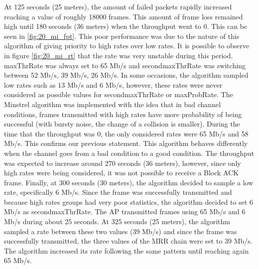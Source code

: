 \documentclass[12]{article}
\begin{document}
At 125 seconds (25 meters), the amount of failed packets rapidly increased reaching a value of roughly 18000 frames. This amount of frame loss remained high until 180 seconds (36 meters) when the throughput went to 0. This can be seen in \ref{fig:20_mi_fpt}. This poor performance was due to the nature of this algorithm of giving priority to high rates over low rates. It is possible to observe in figure \ref{fig:20_mi_rt} that the rate was very unstable during this period. maxThrRate was always set to 65 Mb/s and secondmaxThrRate was switching between 52 Mb/s, 39 Mb/s, 26 Mb/s. In some occasions, the algorithm sampled low rates such as 13 Mb/s and 6 Mb/s, however, these rates were never considered as possible values for secondmaxThrRate or maxProbRate. The Minstrel algorithm was implemented with the idea that in bad channel conditions, frames transmitted with high rates have more probability of being successful (with bursty noise, the change of a collision is smaller). During the time that the throughput was 0, the only considered rates were 65 Mb/s and 58 Mb/s. This confirms our previous statement. This algorithm behaves differently when the channel goes from a bad condition to a good condition. The throughput was expected to increase around 270 seconds (36 meters), however, since only high rates were being considered, it was not possible to receive a Block ACK frame. Finally, at 300 seconds (30 meters), the algorithm decided to sample a low rate, specifically 6 Mb/s. Since the frame was successfully transmitted and because high rates groups had very poor statistics, the algorithm decided to set 6 Mb/s as secondmaxThrRate. The AP transmitted frames using 65 Mb/s and 6 Mb/s during about 25 seconds. At 325 seconds (25 meters), the algorithm sampled a rate between these two values (39 Mb/s) and since the frame was successfully transmitted, the three values of the MRR chain were set to 39 Mb/s. The algorithm increased its rate following the same pattern until reaching again 65 Mb/s.\\
\end{document}
